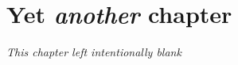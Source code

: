 \chapter{Yet \emph{another} chapter}
\label{cha:yet_another_chapter}

\begin{center}
\emph{This chapter left intentionally blank}
\end{center}

